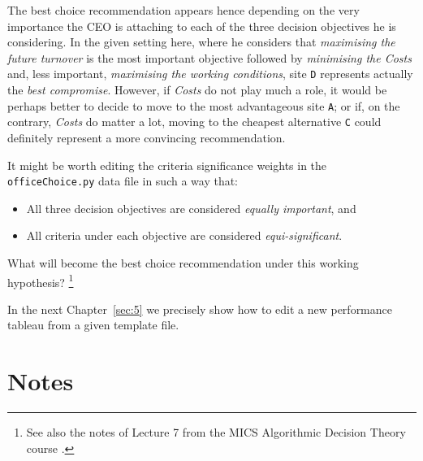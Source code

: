 The best choice recommendation appears hence depending on the very importance the CEO is attaching to each of the three decision objectives he is considering. In the given setting here, where he considers that \emph{maximising the future turnover} is the most important objective followed by \emph{minimising the Costs} and, less important, \emph{maximising the working conditions}, site \texttt{D} represents actually the \emph{best compromise}. However, if \emph{Costs} do not play much a role, it would be perhaps better to decide to move to the most advantageous site \texttt{A}; or if, on the contrary, \emph{Costs} do matter a lot, moving to the cheapest alternative \texttt{C} could definitely represent a more convincing recommendation. 

It might be worth editing the criteria significance weights in the\\
\texttt{officeChoice.py} data file in such a way that:
\begin{itemize}
\item All three decision objectives are considered \emph{equally important}, and
\item All criteria under each objective are considered \emph{equi-significant}.
\end{itemize}
What will become the best choice recommendation under this working hypothesis? \footnote{See also the notes of Lecture 7 from the MICS Algorithmic Decision Theory course \citep{ADT-L7}.} 

\vspace{1cm}

In the next Chapter~\ref{sec:5} we precisely show how to edit a new performance tableau from a given template file. 

{}
\section*{Notes}

